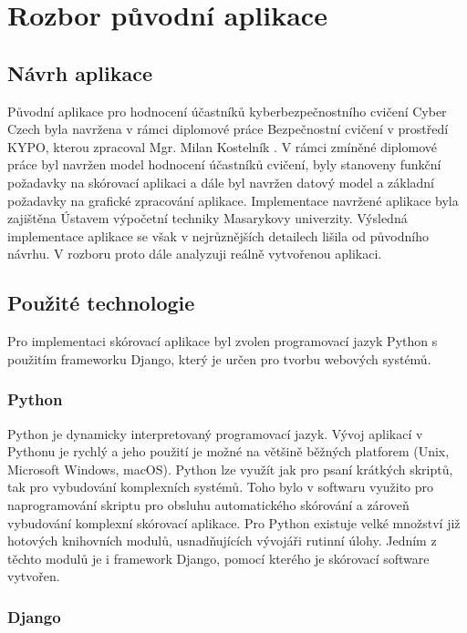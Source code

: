 \documentclass[
  digital, %
  twoside, %
  table,   %
  nolof,     %
  nolot,     %
]{fithesis3}
\begin{document}
\chapter{Rozbor původní aplikace}
\section{Návrh aplikace}

Původní aplikace pro hodnocení účastníků kyberbezpečnostního cvičení Cyber Czech byla navržena v rámci diplomové práce Bezpečnostní cvičení v prostředí KYPO, kterou zpracoval Mgr. Milan Kostelník \cite{Kostelnik2016thesis}. V rámci zmíněné diplomové práce byl navržen model hodnocení účastníků cvičení, byly stanoveny funkční požadavky na skórovací aplikaci a dále byl navržen datový model a základní požadavky na grafické zpracování aplikace. Implementace navržené aplikace byla zajištěna Ústavem výpočetní techniky Masarykovy univerzity. Výsledná implementace aplikace se však v nejrůznějších detailech lišila od původního návrhu. V rozboru proto dále analyzuji reálně vytvořenou aplikaci.  

\section{Použité technologie}
Pro implementaci skórovací aplikace byl zvolen programovací jazyk Python s použitím frameworku Django, který je určen pro tvorbu webových systémů. 

\subsection{Python}
Python je dynamicky interpretovaný programovací jazyk. Vývoj aplikací v Pythonu je rychlý a jeho použití je možné na většině běžných platforem (Unix, Microsoft Windows, macOS). Python lze využít jak pro psaní krátkých skriptů, tak pro vybudování komplexních systémů. Toho bylo v softwaru využito pro naprogramování skriptu pro obsluhu automatického skórování a zároveň vybudování komplexní skórovací aplikace. Pro Python existuje velké množství již hotových knihovních modulů, usnadňujících vývojáři rutinní úlohy. Jedním z těchto modulů je i framework Django, pomocí kterého je skórovací software vytvořen.

\subsection{Django}
\end{document}
